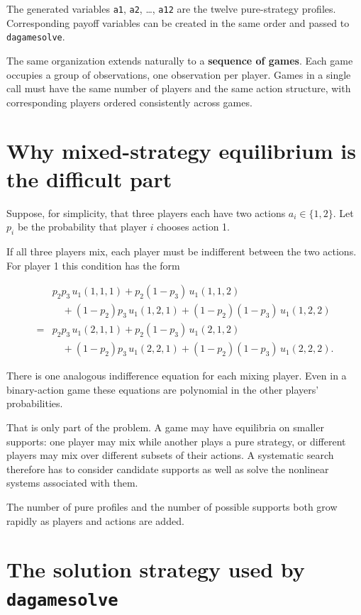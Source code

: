 \documentclass[11pt]{article}
\begin{document}
    The generated variables \texttt{a1}, \texttt{a2}, \ldots, \texttt{a12}
are the twelve pure-strategy profiles. Corresponding payoff variables
can be created in the same order and passed to \texttt{dagamesolve}.

The same organization extends naturally to a \textbf{sequence of games}.
Each game occupies a group of observations, one observation per player.
Games in a single call must have the same number of players and the same
action structure, with corresponding players ordered consistently across
games.

    \section{Why mixed-strategy equilibrium is the difficult
part}\label{why-mixed-strategy-equilibrium-is-the-difficult-part}

Suppose, for simplicity, that three players each have two actions
\(a_i \in \{1,2\}\). Let \(p_i\) be the probability that player \(i\)
chooses action 1.

If all three players mix, each player must be indifferent between the
two actions. For player 1 this condition has the form

\[
\begin{aligned}
& p_2p_3\,u_1(1,1,1)
+p_2(1-p_3)\,u_1(1,1,2) \\
&\quad +(1-p_2)p_3\,u_1(1,2,1)
+(1-p_2)(1-p_3)\,u_1(1,2,2) \\
={}&
p_2p_3\,u_1(2,1,1)
+p_2(1-p_3)\,u_1(2,1,2) \\
&\quad +(1-p_2)p_3\,u_1(2,2,1)
+(1-p_2)(1-p_3)\,u_1(2,2,2).
\end{aligned}
\]

There is one analogous indifference equation for each mixing player.
Even in a binary-action game these equations are polynomial in the other
players' probabilities.

That is only part of the problem. A game may have equilibria on smaller
supports: one player may mix while another plays a pure strategy, or
different players may mix over different subsets of their actions. A
systematic search therefore has to consider candidate supports as well
as solve the nonlinear systems associated with them.

The number of pure profiles and the number of possible supports both
grow rapidly as players and actions are added.

    \section{\texorpdfstring{The solution strategy used by
\texttt{dagamesolve}}{The solution strategy used by dagamesolve}}\label{the-solution-strategy-used-by-dagamesolve}
\end{document}
